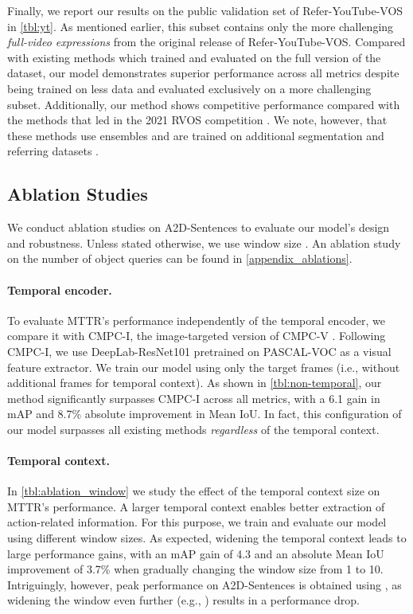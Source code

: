 \documentclass[10pt,twocolumn,letterpaper]{article}
\renewcommand{\cite}[1]{\citep{#1}}
\newcommand{\methodname}{MTTR}
\begin{document}
Finally, we report our results on the public validation set of Refer-YouTube-VOS \cite{seo2020urvos} in \cref{tbl:yt}. As mentioned earlier, this subset contains only the more challenging \textit{full-video expressions} from the original release of Refer-YouTube-VOS. 
Compared with existing methods \cite{seo2020urvos,liu2021cmpc} which trained and evaluated on the full version of the dataset, our model demonstrates superior performance across all metrics despite being trained on less data and evaluated exclusively on a more challenging subset. Additionally, our method shows competitive performance compared with the methods that led in the 2021 RVOS competition \cite{liang2021rethinking,ding2021progressive}. We note, however, that these methods use ensembles and are trained on additional segmentation and referring datasets  \cite{lin2014coco,xu2018youtube,yu2016refcoco,mao2016refcocoplus}.

\subsection{Ablation Studies}
We conduct ablation studies on A2D-Sentences to evaluate our model's design and robustness. Unless stated otherwise, we use window size . An ablation study on the number of object queries can be found in \cref{appendix_ablations}.

\paragraph{Temporal encoder.} To evaluate \methodname's performance independently of the temporal encoder, we compare it with CMPC-I, the image-targeted version of CMPC-V \cite{liu2021cmpc}. Following CMPC-I, we use DeepLab-ResNet101 \cite{chen2017deeplab} pretrained on PASCAL-VOC \cite{everingham2010pascal} as a visual feature extractor. We train our model using only the target frames (i.e., without additional frames for temporal context). As shown in \cref{tbl:non-temporal}, our method significantly surpasses CMPC-I across all metrics, with a 6.1 gain in mAP and 8.7\% absolute improvement in Mean IoU. In fact, this configuration of our model surpasses all existing methods \textit{regardless} of the temporal context. 

\paragraph{Temporal context.} In \cref{tbl:ablation_window} we study the effect of the temporal context size on \methodname's performance. A larger temporal context enables better extraction of action-related information.
For this purpose, we train and evaluate our model using different window sizes. As expected, widening the temporal context leads to large performance gains, with an mAP gain of 4.3 and an absolute Mean IoU improvement of 3.7\% when gradually changing the window size from 1 to 10. Intriguingly, however, peak performance on A2D-Sentences is obtained using , as widening the window even further (e.g., ) results in a performance drop.
\end{document}
